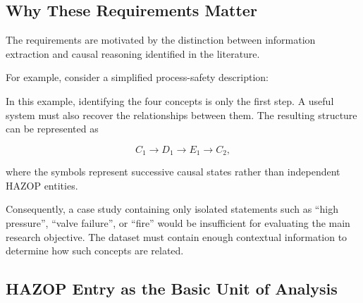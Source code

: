\subsection{Why These Requirements Matter}

The requirements are motivated by the distinction between
information extraction and causal reasoning identified in the
literature.

For example, consider a simplified process-safety description:

\begin{center}
\end{center}

In this example, identifying the four concepts is only the first
step. A useful system must also recover the relationships between
them. The resulting structure can be represented as

\begin{equation}
C_1 \rightarrow D_1 \rightarrow E_1 \rightarrow C_2,
\end{equation}

where the symbols represent successive causal states rather than
independent HAZOP entities.

Consequently, a case study containing only isolated statements such as
``high pressure'', ``valve failure'', or ``fire'' would be insufficient
for evaluating the main research objective. The dataset must contain
enough contextual information to determine how such concepts are
related.

\subsection{HAZOP Entry as the Basic Unit of Analysis}

